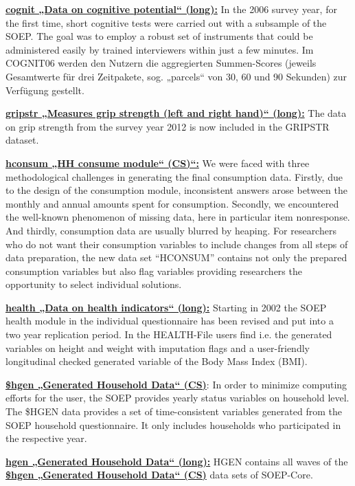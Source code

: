 \documentclass[letterpaper,10pt,openany,onesideH,english]{sphinxmanual}
\begin{document}
 \href{https://paneldata.org/soep-core/data/cognit}{\textbf{cognit „Data on cognitive potential“ (long):}} In the 2006 survey year, for the first time, short cognitive tests were carried out with a subsample of the SOEP. The goal was to employ a robust set of instruments that could be administered easily by trained interviewers within just a few minutes. Im COGNIT06 werden den Nutzern die aggregierten Summen-Scores (jeweils Gesamtwerte für drei Zeitpakete, sog. „parcels“ von 30, 60 und 90 Sekunden) zur Verfügung gestellt.

 \href{https://paneldata.org/soep-core/data/gripstr}{\textbf{gripstr „Measures grip strength (left and right hand)“ (long):}} The data on grip strength from the survey year 2012 is now included in the GRIPSTR dataset.

 \href{https://paneldata.org/soep-core/data/hconsum}{\textbf{hconsum „HH consume module“ (CS)“:}} We were faced with three methodological challenges in generating the final consumption data. Firstly, due to the design of the consumption module, inconsistent answers arose between the monthly and annual amounts spent for consumption. Secondly, we encountered the well-known phenomenon of missing data, here in particular item nonresponse. And thirdly, consumption data are usually blurred by heaping. For researchers who do not want their consumption variables to include changes from all steps of data preparation, the new data set “HCONSUM” contains not only the prepared consumption variables but also flag variables providing researchers the opportunity to select individual solutions.

 \href{https://paneldata.org/soep-core/data/health}{\textbf{health „Data on health indicators“ (long):}} Starting in 2002 the SOEP health module in the individual questionnaire has been revised and put into a two year replication period. In the HEALTH-File users find i.e. the generated variables on height and weight with imputation flags and a user-friendly longitudinal checked generated variable of the Body Mass Index (BMI).

 \href{https://paneldata.org/soep-core/data/bghgen}{\textbf{\$hgen „Generated Household Data“ (CS)}}: In order to minimize computing efforts for the user, the SOEP provides yearly status variables on household level. The \$HGEN data provides a set of time-consistent variables generated from the SOEP household questionnaire. It only includes households who participated in the respective year.

 \href{https://paneldata.org/soep-long/data/hgenlong}{\textbf{hgen „Generated Household Data“ (long):}} HGEN contains all waves of the  \href{https://paneldata.org/soep-core/data/bghgen}{\textbf{\$hgen „Generated Household Data“ (CS)}} data sets of SOEP-Core.
\end{document}

